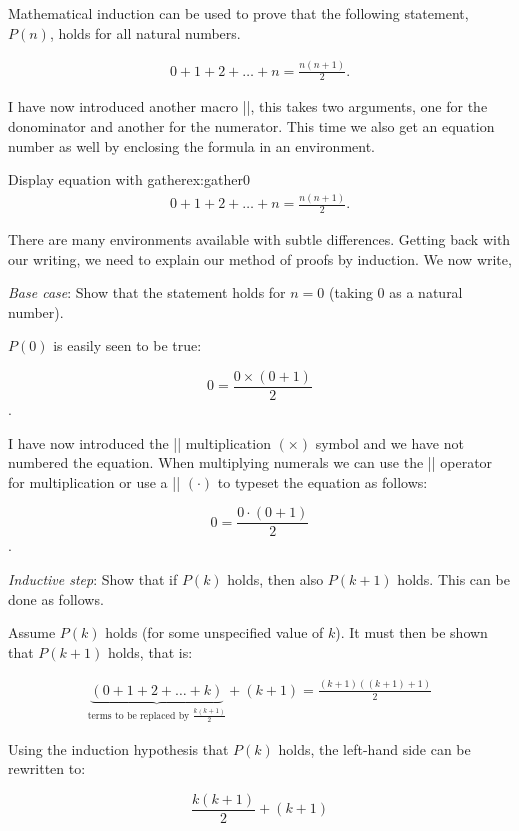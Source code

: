 Mathematical induction can be used to prove that the following statement, $P(n)$, holds for all natural numbers.

\begin{gather}
0 + 1 +2 + \dots +n = \frac{n(n+1)}{2}.
\end{gather}

I have now introduced another macro |\frac|, this takes two arguments, one for the donominator and another for the numerator. This time we also get an equation number as well by enclosing the formula in an environment.

\begin{texexample}{Display equation with gather}{ex:gather0}
\begin{gather}
0 + 1 +2 + \dots +n = \frac{n(n+1)}{2}.
\end{gather}
\end{texexample}

There are many environments available with subtle differences. Getting back with our writing, we need to explain our method of proofs by induction. We now write,

\textit{Base case}: Show that the statement holds for $n=0$ (taking 0 as a natural number).

$P(0)$ is easily seen to be true:

\[0 = \frac{0\times(0+1)}{2}\].

I have now introduced the |\times| multiplication $(\times)$ symbol and we have not numbered the equation. When multiplying numerals we can use the |\times| operator for multiplication or use a |\cdot| $(\cdot)$ to typeset the equation as follows:

\[0 = \frac{0\cdot(0+1)}{2}\].


\textit{Inductive step}: Show that if $P(k)$ holds, then also $P(k + 1)$ holds. This can be done as follows.

Assume $P(k)$ holds (for some unspecified value of $k$). It must then be shown that $P(k + 1)$ holds, that is:

\begin{gather}
\underbrace{(0+1+2+\dots+k)}_\text{terms to be replaced by $\frac{k(k+1)}{2}$} + (k+1) = \frac{(k+1)((k+1) +1 ) }{2} \label{eq:underbrace}
\end{gather}



Using the induction hypothesis that $P(k)$ holds, the left-hand side can be rewritten to:

\[ \frac{k(k+1)}{2} + (k+1) \]

